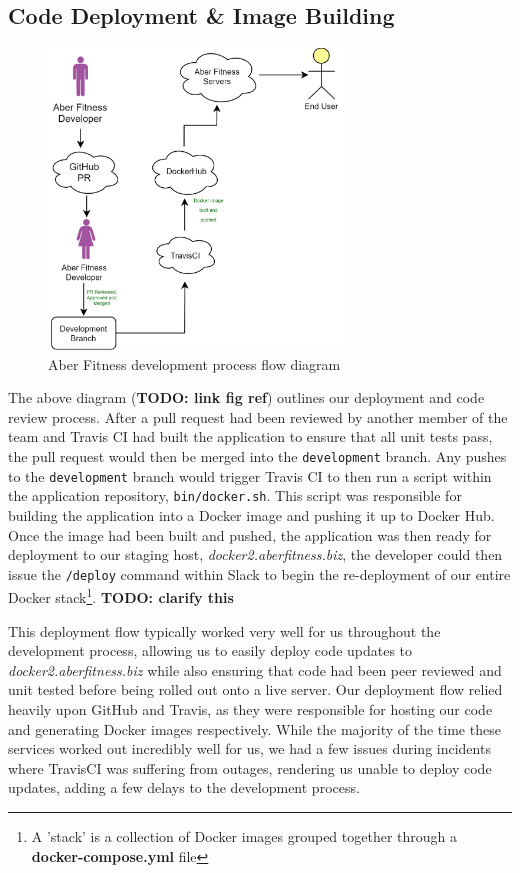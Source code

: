 
\subsection{Code Deployment \& Image Building}
\begin{figure}[H]
    \centering
    \includegraphics[width=0.7\textwidth]{Images/diagram_af.png}
    \caption{Aber Fitness development process flow diagram}
\end{figure}

The above diagram (\textbf{TODO: link fig ref}) outlines our deployment and code review process. After a pull request had been reviewed by another member of the team and Travis CI had built the application to ensure that all unit tests pass, the pull request would then be merged into the \lstinline{development} branch. Any pushes to the \lstinline{development} branch would trigger Travis CI to then run a script within the application repository, \lstinline{bin/docker.sh}. This script was responsible for building the application into a Docker image and pushing it up to Docker Hub. Once the image had been built and pushed, the application was then ready for deployment to our staging host, \textit{docker2.aberfitness.biz}, the developer could then issue the \lstinline{/deploy} command within Slack to begin the re-deployment of our entire Docker stack\footnote{A 'stack' is a collection of Docker images grouped together through a \textbf{docker-compose.yml} file}. \textbf{TODO: clarify this}

This deployment flow typically worked very well for us throughout the development process, allowing us to easily deploy code updates to \textit{docker2.aberfitness.biz} while also ensuring that code had been peer reviewed and unit tested before being rolled out onto a live server. Our deployment flow relied heavily upon GitHub and Travis, as they were responsible for hosting our code and generating Docker images respectively. While the majority of the time these services worked out incredibly well for us, we had a few issues during incidents where TravisCI was suffering from outages, rendering us unable to deploy code updates, adding a few delays to the development process.


